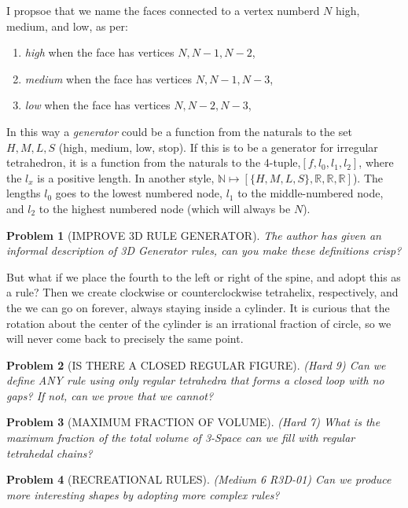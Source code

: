 \documentclass[11pt]{article}
\newtheorem{problem}{Problem}
\begin{document}
I propsoe that we name the faces connected to a vertex numberd $N$ high, medium, and low, as per:
\begin{enumerate}
\item {\em high} when the face has vertices ${N, N-1, N-2}$,
\item {\em medium} when the face has vertices ${N, N-1, N-3}$,
  \item {\em low} when the face has vertices ${N, N-2, N-3}$,    
\end{enumerate}

In this way a {\em generator} could be a function from the naturals to the set ${H,M,L,S}$ (high, medium, low, stop). If this is to be
a generator for irregular tetrahedron, it is a function from the naturals to the 4-tuple,$[f,l_0,l_1,l_2]$, where the $l_x$ is a positive length.
In another style, $\mathbb{N} \mapsto [\{H,M,L,S\},\mathbb{R},\mathbb{R},\mathbb{R}]$). The lengths $l_0$ goes to the lowest numbered node, $l_1$ to the middle-numbered node,
and $l_2$ to the highest numbered node (which will always be $N$).

\begin{problem}[IMPROVE 3D RULE GENERATOR]
  The author has given an informal description of 3D Generator rules, can you make these definitions crisp?
\end{problem}

But what if we place the fourth to the left or right of the spine, and adopt this as a rule? Then we create
clockwise or counterclockwise tetrahelix, respectively, and the we can go on forever, always staying inside a cylinder.
It is curious that the rotation about the center of the cylinder is an irrational fraction of circle, so we will
never come back to precisely the same point.

\begin{problem}[IS THERE A CLOSED REGULAR FIGURE]
(Hard 9) Can we define ANY rule using only regular tetrahedra that forms a closed loop with no gaps? If not, can we prove that we cannot?  
\end{problem}


\begin{problem}[MAXIMUM FRACTION OF VOLUME]
(Hard 7) What is the maximum fraction of the total volume of 3-Space can we fill with regular tetrahedal chains?
\end{problem}

\begin{problem}[RECREATIONAL RULES]
(Medium 6 R3D-01) Can we produce more interesting shapes by adopting more complex rules?  
\end{problem}
\end{document}
